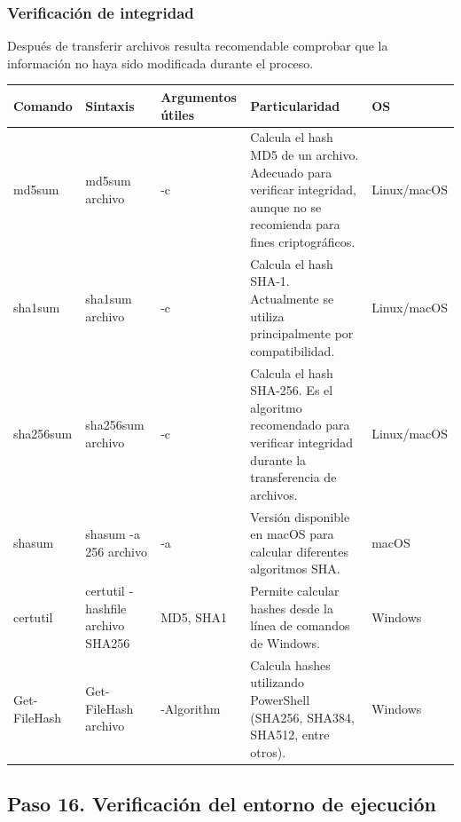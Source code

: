 \documentclass[a4paper,10pt]{article}
\begin{document}

\subsubsection{Verificación de integridad}

Después de transferir archivos resulta recomendable comprobar que la
información no haya sido modificada durante el proceso.

\begin{longtable}{|p{2.8cm}|p{3.3cm}|p{4cm}|p{5.3cm}|p{1.5cm}|}

\hline
Comando &
Sintaxis &
Argumentos útiles &
Particularidad &
OS
\\
\hline
\endhead

md5sum &
md5sum archivo &
-c &
Calcula el hash MD5 de un archivo. Adecuado para verificar integridad, aunque no se recomienda para fines criptográficos. &
Linux/macOS
\\
\hline

sha1sum &
sha1sum archivo &
-c &
Calcula el hash SHA-1. Actualmente se utiliza principalmente por compatibilidad. &
Linux/macOS
\\
\hline

sha256sum &
sha256sum archivo &
-c &
Calcula el hash SHA-256. Es el algoritmo recomendado para verificar integridad durante la transferencia de archivos. &
Linux/macOS
\\
\hline

shasum &
shasum -a 256 archivo &
-a &
Versión disponible en macOS para calcular diferentes algoritmos SHA. &
macOS
\\
\hline

certutil &
certutil -hashfile archivo SHA256 &
MD5, SHA1 &
Permite calcular hashes desde la línea de comandos de Windows. &
Windows
\\
\hline

Get-FileHash &
Get-FileHash archivo &
-Algorithm &
Calcula hashes utilizando PowerShell (SHA256, SHA384, SHA512, entre otros). &
Windows
\\
\hline

\end{longtable}


\subsection{Paso 16. Verificación del entorno de ejecución}
\end{document}
